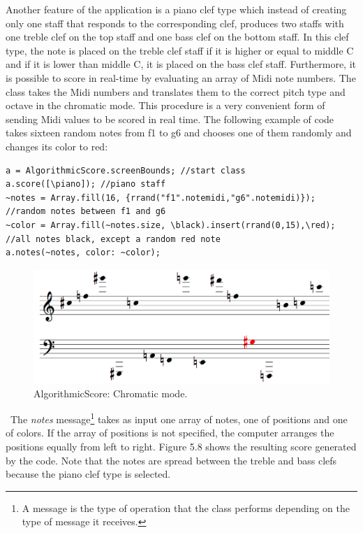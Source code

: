 Another feature of the application is a piano clef type which instead of creating only one staff that responds to the corresponding clef, produces two staffs with one treble clef on the top staff and one bass clef on the bottom staff. In this clef type, the note is placed on the treble clef staff if it is higher or equal to middle C and if it is lower than middle C, it is placed on the bass clef staff. Furthermore, it is possible to score in real-time by evaluating an array of Midi note numbers. The class takes the Midi numbers and translates them to the correct pitch type and octave in the chromatic mode. This procedure is a very convenient form of sending Midi values to be scored in real time. The following example of code takes sixteen random notes from f1 to g6 and chooses one of them randomly and changes its color to red:
\begin{verbatim}
a = AlgorithmicScore.screenBounds; //start class
a.score([\piano]); //piano staff
~notes = Array.fill(16, {rrand("f1".notemidi,"g6".notemidi)}); 
//random notes between f1 and g6
~color = Array.fill(~notes.size, \black).insert(rrand(0,15),\red);
//all notes black, except a random red note
a.notes(~notes, color: ~color);
\end{verbatim}
\begin{figure}[htbp] %
   \centering
   \includegraphics[width=14cm]{chapter5/algoscore2.tif} %
   \caption{AlgorithmicScore: Chromatic mode.}
   \label{fig:example}
\end{figure}\
The \emph{notes} message\footnote{A message is the type of operation that the class performs depending on the type of message it receives.} takes as input one array of notes, one of positions and one of colors. If the array of positions is not specified, the computer arranges the positions equally from left to right. Figure 5.8 shows the resulting score generated by the code. Note that the notes are spread between the treble and bass clefs because the piano clef type is selected. 

